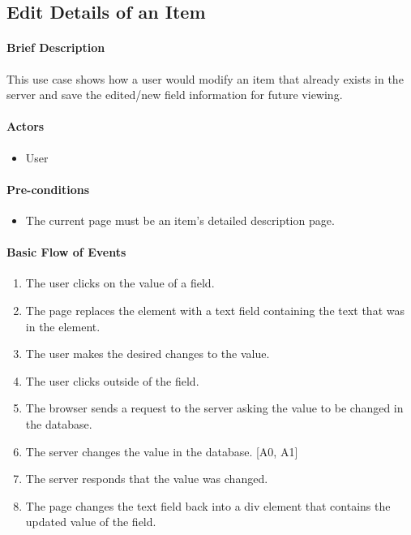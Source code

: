 \documentclass{article}
\begin{document}
\subsection{Edit Details of an Item}

\paragraph{Brief Description}
This use case shows how a user would modify an item that already exists in the server and save the edited/new field information for future viewing.

\paragraph{Actors}
\begin{itemize}
\item User
\end{itemize}

\paragraph{Pre-conditions}
\begin{itemize}
\item The current page must be an item's detailed description page.
\end{itemize}

\paragraph{Basic Flow of Events}
\begin{enumerate}
\item The user clicks on the value of a field.
\item The page replaces the element with a text field containing the text that was in the element.
\item The user makes the desired changes to the value.
\item The user clicks outside of the field.
\item The browser sends a request to the server asking the value to be changed in the database.
\item The server changes the value in the database. [A0, A1]
\item The server responds that the value was changed.
\item The page changes the text field back into a div element that contains the updated value of the field.
\end{enumerate}
\end{document}
